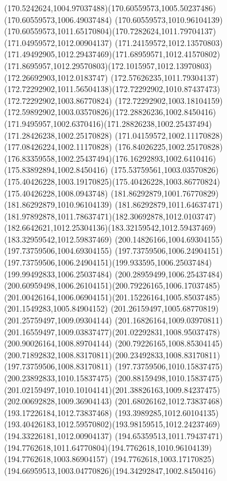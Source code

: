 {{	\curveto(170.5242624,1004.97037488)(170.60559573,1005.50237486)(170.60559573,1006.49037484)
	\lineto(170.60559573,1010.96104139)
	\curveto(170.60559573,1011.65170804)(170.7282624,1011.79704137)(171.04959572,1012.00904137)
	\curveto(171.24159572,1012.13570803)(171.49492905,1012.29437469)(171.68959571,1012.41570802)
	\curveto(171.8695957,1012.29570803)(172.1015957,1012.13970803)(172.26692903,1012.0183747)
	\curveto(172.57626235,1011.79304137)(172.72292902,1011.56504138)(172.72292902,1010.87437473)
	\lineto(172.72292902,1003.86770824)
	\curveto(172.72292902,1003.18104159)(172.59892902,1003.03570826)(172.28826236,1002.8450416)
	\curveto(171.9495957,1002.6370416)(171.28826238,1002.25437494)(171.28426238,1002.25170828)
	\lineto(171.04159572,1002.11170828)
	\lineto(177.08426224,1002.11170828)
	\lineto(176.84026225,1002.25170828)
	\curveto(176.83359558,1002.25437494)(176.16292893,1002.6410416)(175.83892894,1002.8450416)
	\curveto(175.53759561,1003.03570826)(175.40426228,1003.19170825)(175.40426228,1003.86770824)
	\lineto(175.40426228,1008.0943748)
	\lineto(181.86292879,1001.76770829)
	\lineto(181.86292879,1010.96104139)
	\curveto(181.86292879,1011.64637471)(181.97892878,1011.78637471)(182.30692878,1012.0103747)
	\curveto(182.6642621,1012.25304136)(183.32159542,1012.59437469)(183.32959542,1012.59837469)
	\closepath
	\moveto(200.14826166,1004.69304155)
	\lineto(197.73759506,1004.69304155)
	\lineto(197.73759506,1006.24904151)
	\curveto(197.73759506,1006.24904151)(199.933595,1006.25037484)(199.99492833,1006.25037484)
	\curveto(200.28959499,1006.25437484)(200.60959498,1006.26104151)(200.79226165,1006.17037485)
	\curveto(201.00426164,1006.06904151)(201.15226164,1005.85037485)(201.1549283,1005.84904152)
	\lineto(201.26159497,1005.68770819)
	\lineto(201.25759497,1009.09304144)
	\lineto(201.16826164,1009.03970811)
	\curveto(201.16559497,1009.03837477)(201.02292831,1008.95037478)(200.90026164,1008.89704144)
	\curveto(200.79226165,1008.85304145)(200.71892832,1008.83170811)(200.23492833,1008.83170811)
	\lineto(197.73759506,1008.83170811)
	\lineto(197.73759506,1010.15837475)
	\lineto(200.23892833,1010.15837475)
	\curveto(200.88159498,1010.15837475)(201.02159497,1010.10104141)(201.38826163,1009.84237475)
	\lineto(202.00692828,1009.36904143)
	\lineto(201.68026162,1012.73837468)
	\lineto(193.17226184,1012.73837468)
	\lineto(193.3989285,1012.60104135)
	\curveto(193.40426183,1012.59570802)(193.98159515,1012.24237469)(194.33226181,1012.00904137)
	\curveto(194.65359513,1011.79437471)(194.7762618,1011.64770804)(194.7762618,1010.96104139)
	\lineto(194.7762618,1003.86904157)
	\curveto(194.7762618,1003.17170825)(194.66959513,1003.04770826)(194.34292847,1002.8450416)
}}
